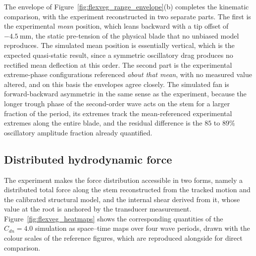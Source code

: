 \noindent
The envelope of Figure~\ref{fig:flexveg_range_envelope}(b) completes the kinematic comparison, with the experiment reconstructed in two separate parts. The first is the experimental \emph{mean} position, which leans backward with a tip offset of $-4.5~\mathrm{mm}$, the static pre-tension of the physical blade that no unbiased model reproduces. The simulated mean position is essentially vertical, which is the expected quasi-static result, since a symmetric oscillatory drag produces no rectified mean deflection at this order. The second part is the experimental extreme-phase configurations referenced \emph{about that mean}, with no measured value altered, and on this basis the envelopes agree closely. The simulated fan is forward-backward asymmetric in the same sense as the experiment, because the longer trough phase of the second-order wave acts on the stem for a larger fraction of the period, its extremes track the mean-referenced experimental extremes along the entire blade, and the residual difference is the $85$ to $89\%$ oscillatory amplitude fraction already quantified.

\subsection{Distributed hydrodynamic force}
\label{sec:flexveg_force}
The experiment makes the force distribution accessible in two forms, namely a distributed total force along the stem reconstructed from the tracked motion and the calibrated structural model, and the internal shear derived from it, whose value at the root is anchored by the transducer measurement. Figure~\ref{fig:flexveg_heatmaps} shows the corresponding quantities of the $C_{dn} = 4.0$ simulation as space--time maps over four wave periods, drawn with the colour scales of the reference figures, which are reproduced alongside for direct comparison.

